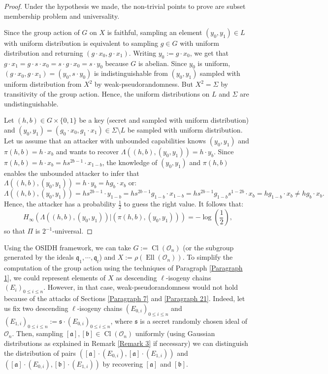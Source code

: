 \documentclass[a4paper,10pt,notitlepage]{report}
\theoremstyle{definition}
\theoremstyle{plain}
\theoremstyle{definition}
\newcommand{\mO}{\mathcal{O}}
\renewcommand{\(}{\left(}
\renewcommand{\)}{\right)}
\newcommand{\mf}[1]{\mathfrak{#1}}
\DeclareMathOperator{\Cl}{Cl}
\DeclareMathOperator{\Ell}{Ell}
\begin{document}
\begin{proof}
Under the hypothesis we made, the non-trivial points to prove are subset membership problem and universality.  

Since the group action of $G$ on $X$ is faithful, sampling an element $(y_0,y_1)\in L$ with uniform distribution is equivalent to sampling $g\in G$ with uniform distribution and returning $(g\cdot x_0, g\cdot x_1)$. Writing $y_0:=g\cdot x_0$, we get that $g\cdot x_1=g\cdot s\cdot x_0=s\cdot g\cdot x_0=s\cdot y_0$ because $G$ is abelian. Since $y_0$ is uniform, $(g\cdot x_0, g\cdot x_1)=(y_0,s\cdot y_0)$ is indistinguishable from $(y_0,y_1)$ sampled with uniform distribution from $X^2$ by weak-pseudorandomness. But $X^2=\Sigma$ by transitivity of the group action. Hence, the uniform distributions on $L$ and $\Sigma$ are undistinguishable.

Let $(h,b)\in G\times\{0,1\}$ be a key (secret and sampled with uniform distribution) and $(y_0,y_1)=(g_0\cdot x_0, g_1\cdot x_1)\in \Sigma\setminus L$ be sampled with uniform distribution. Let us assume that an attacker with unbounded capabilities knows $(y_0,y_1)$ and $\pi(h,b)=h\cdot x_b$ and wants to recover $\Lambda((h,b),(y_0,y_1))=h\cdot y_b$. Since $\pi(h,b)=h\cdot x_b=hs^{2b-1}\cdot x_{1-b}$, the knowledge of $(y_0,y_1)$ and $\pi(h,b)$ enables the unbounded attacker to infer that $\Lambda((h,b),(y_0,y_1))=h\cdot y_b=hg_b\cdot x_b$ or:
\[\Lambda((h,b),(y_0,y_1))=hs^{2b-1}\cdot y_{1-b}=hs^{2b-1}g_{1-b}\cdot x_{1-b}=hs^{2b-1}g_{1-b}s^{1-2b}\cdot x_b=hg_{1-b}\cdot x_b\neq hg_b\cdot x_b.\]
Hence, the attacker has a probability $\frac{1}{2}$ to guess the right value. It follows that:
\[H_\infty(\Lambda((h,b),(y_0,y_1))|(\pi(h,b),(y_0,y_1)))=-\log\(\frac{1}{2}\),\]
so that $\Pi$ is $2^{-1}$-universal.
\end{proof}

Using the OSIDH framework, we can take $G:=\Cl(\mO_n)$ (or the subgroup generated by the ideals $\mf{q}_1, \cdots, \mf{q}_t$) and $X:=\rho(\Ell(\mO_n))$. To simplify the computation of the group action using the techniques of Paragraph \ref{Paragraph 1}, we could represent elements of $X$ as descending $\ell$-isogeny chains $(E_i)_{0\leq i\leq n}$. However, in that case, weak-pseudorandomness would not hold because of the attacks of Sections \ref{Paragraph 7} and \ref{Paragraph 21}.  Indeed, let us fix two descending $\ell$-isogeny chains $(E_{0,i})_{0\leq i\leq n}$ and $(E_{1,i})_{0\leq i\leq n}:=\mf{s}\cdot (E_{0,i})_{0\leq i\leq n}$, where $\mf{s}$ is a secret randomly chosen ideal of $\mO_n$. Then, sampling $[\mf{a}],[\mf{b}]\in\Cl(\mO_n)$ uniformly (using Gaussian distributions as explained in Remark \ref{Remark 3} if necessary) we can distinguish the distribution of pairs $([\mf{a}]\cdot(E_{0,i}),[\mf{a}]\cdot(E_{1,i}))$ and $([\mf{a}]\cdot(E_{0,i}),[\mf{b}]\cdot(E_{1,i}))$ by recovering $[\mf{a}]$ and $[\mf{b}]$. 
\end{document}
